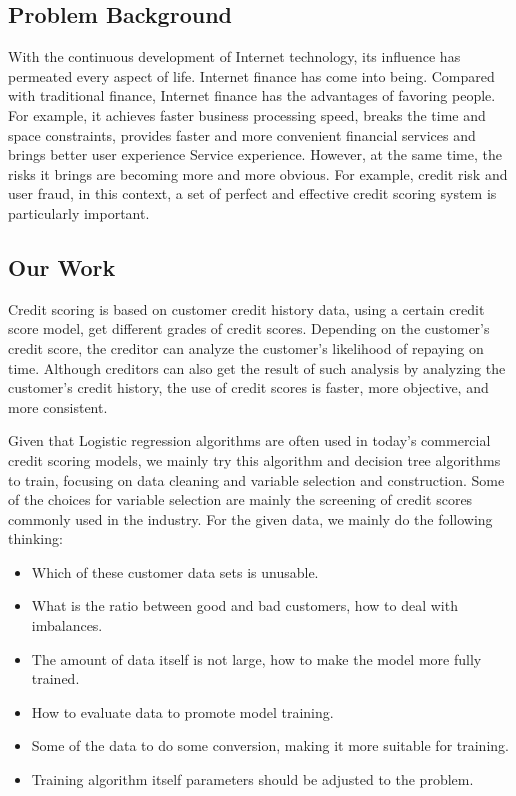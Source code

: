 \documentclass{mcmthesis}
\begin{document}
\subsection{Problem Background}

With the continuous development of Internet technology, its influence has permeated every aspect of life. Internet finance has come into being. Compared with traditional finance, Internet finance has the advantages of favoring people. For example, it achieves faster business processing speed, breaks the time and space constraints, provides faster and more convenient financial services and brings better user experience Service experience. However, at the same time, the risks it brings are becoming more and more obvious. For example, credit risk and user fraud, in this context, a set of perfect and effective credit scoring system is particularly important.
\subsection{Our Work}
Credit scoring is based on customer credit history data, using a certain credit score model, get different grades of credit scores. Depending on the customer's credit score, the creditor can analyze the customer's likelihood of repaying on time. Although creditors can also get the result of such analysis by analyzing the customer's credit history, the use of credit scores is faster, more objective, and more consistent.

Given that Logistic regression algorithms are often used in today's commercial credit scoring models, we mainly try this algorithm and decision tree algorithms to train, focusing on data cleaning and variable selection and construction. Some of the choices for variable selection are mainly the screening of credit scores commonly used in the industry. For the given data, we mainly do the following thinking:
\begin{itemize}
\item Which of these customer data sets is unusable.
\item What is the ratio between good and bad customers, how to deal with imbalances.
\item The amount of data itself is not large, how to make the model more fully trained.
\item How to evaluate data to promote model training.
\item Some of the data to do some conversion, making it more suitable for training.
\item Training algorithm itself parameters should be adjusted to the problem.
\end{itemize}
\end{document}
